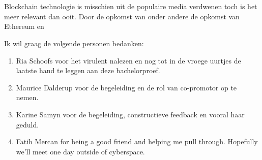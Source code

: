 
\chapter*{}
\label{ch:voorwoord}

Blockchain technologie is misschien uit de populaire media verdwenen toch is het meer relevant dan ooit. Door de opkomst van onder andere de opkomst van Ethereum en 

Ik wil graag de volgende personen bedanken:

\begin{enumerate}
\item Ria Schoofs voor het virulent nalezen en nog tot in de vroege uurtjes de laatste hand te leggen aan deze bachelorproef.
\item Maurice Dalderup voor de begeleiding en de rol van co-promotor op te nemen.
\item Karine Samyn voor de begeleiding, constructieve feedback en vooral haar geduld.
\item Fatih Mercan for being a good friend and helping me pull through. Hopefully we'll meet one day outside of cyberspace. 
\end{enumerate}
